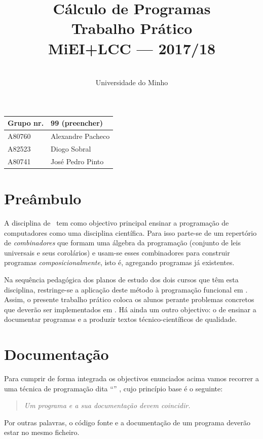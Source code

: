 \documentclass[a4paper]{article}
\title{
       	    Cálculo de Programas
\\
       	Trabalho Prático
\\
       	MiEI+LCC --- 2017/18
}
\author{
       	\dium
\\
       	Universidade do Minho
}
\date\mydate
\begin{document}
\maketitle

\begin{center}\large
\begin{tabular}{ll}
\textbf{Grupo} nr. & 99 (preencher)
\\\hline
A80760 & Alexandre Pacheco
\\
A82523 & Diogo Sobral
\\
A80741 & José Pedro Pinto
\end{tabular}
\end{center}

\section{Preâmbulo}

A disciplina de \CP\ tem como objectivo principal ensinar
a progra\-mação de computadores como uma disciplina científica. Para isso
parte-se de um repertório de \emph{combinadores} que formam uma álgebra da
programação (conjunto de leis universais e seus corolários) e usam-se esses
combinadores para construir programas \emph{composicionalmente}, isto é,
agregando programas já existentes.

Na sequência pedagógica dos planos de estudo dos dois cursos que têm esta
disciplina, restringe-se a aplicação deste método à programação funcional
em \Haskell. Assim,
o presente trabalho prático coloca os alunos perante problemas
concretos que deverão ser implementados em \Haskell.
Há ainda um outro objectivo: o de ensinar a documentar programas e
a produzir textos técnico-científicos de qualidade.

\section{Documentação}
Para cumprir de forma integrada os objectivos enunciados acima vamos recorrer
a uma técnica de programa\-ção dita ``'' \cite{Kn92}, cujo
princípio base é o seguinte:
\begin{quote}\em
Um programa e a sua documentação devem coincidir.
\end{quote}
Por outras palavras, o código fonte e a documentação de um programa deverão estar no
mesmo ficheiro.
\end{document}
